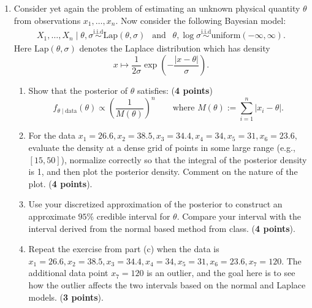 \documentclass{scrartcl}
\def\qt#1{\qquad\text{#1}}
\begin{document}
\begin{enumerate}
\item Consider yet again the problem of estimating an unknown physical
  quantity $\theta$ from observations $x_1, \dots, x_n$. Now consider the
  following Bayesian model:
    \begin{align*}
    X_1, \dots, X_n \mid \theta, \sigma \overset{\text{i.i.d}}{\sim}
    \text{Lap}(\theta, \sigma)  ~~ \text{ and } ~~ \theta, \log \sigma
    \overset{\text{i.i.d}}{\sim} \text{uniform}(-\infty, \infty).
    \end{align*}
    Here $\text{Lap}(\theta, \sigma)$ denotes the Laplace distribution which has density
    \begin{equation*}
x \mapsto    \frac{1}{2\sigma} \exp \left(-\frac{|x - \theta|}{\sigma} \right).
    \end{equation*}
    \begin{enumerate}
    \item Show that the posterior of $\theta$ satisfies: (\textbf{4 points})
  \begin{equation*}
     f_{\theta \mid \text{data}}(\theta) \propto
     \left(\frac{1}{M(\theta)} \right)^n \qt{where $M(\theta) :=
       \sum_{i=1}^n |x_i - \theta|$}. 
   \end{equation*}
  \item For the data  $x_1 = 26.6, x_2 = 38.5, x_3 = 34.4,
  x_4 = 34, x_5 = 31, x_6 = 23.6$, evaluate the density at a dense
  grid of points in some large range (e.g., $[15, 50]$), normalize
  correctly so that the integral of the posterior density is 1, and
  then plot the posterior density. Comment on the nature of the
  plot. (\textbf{4 points}).
  \item Use your discretized approximation of the posterior to
    construct an approximate $95\%$ credible interval for
    $\theta$. Compare your interval with the interval derived from the
    normal based method from class. (\textbf{4 points}).
  \item Repeat the exercise from part (c) when the data is $x_1 =
    26.6, x_2 = 38.5, x_3 = 34.4, x_4 = 34, x_5 = 31, x_6 = 23.6, x_7
    = 120$. The additional data point $x_7 = 120$ is an outlier, and
    the goal here is to see how the outlier affects the two intervals based on the
    normal and  Laplace models. (\textbf{3 points}).
  \end{enumerate}

\end{enumerate}
\end{document}
